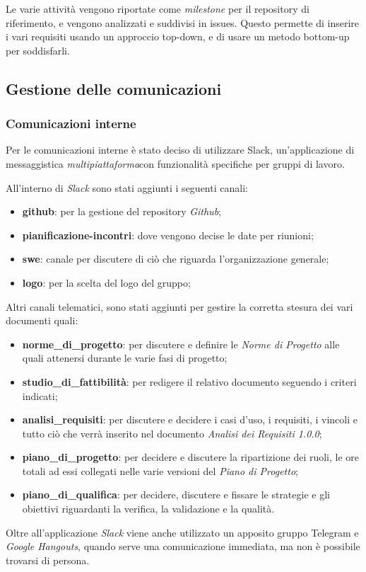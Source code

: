    		\noindent Le varie attività vengono riportate come \textit{milestone\glo} per il repository di riferimento, e vengono analizzati e suddivisi in issues. Questo permette di inserire i vari requisiti usando un approccio top-down, e di usare un metodo bottom-up per soddisfarli.
   		
   	\subsection{Gestione delle comunicazioni}
   		\subsubsection{Comunicazioni interne}
   		Per le comunicazioni interne è stato deciso di utilizzare  Slack\glos, un'applicazione di messaggistica \textit{multipiattaforma}\glo con funzionalità specifiche per gruppi di lavoro. 
   		
   		\noindent All'interno di \textit{Slack\glo} sono stati aggiunti i seguenti canali:
   		\begin{itemize}
   			\item \textbf{github}: per la gestione del repository \textit{Github\glo};
   			\item \textbf{pianificazione-incontri}: dove vengono decise le date per riunioni;
   			\item \textbf{swe}: canale per discutere di ciò che riguarda l'organizzazione generale;
   			\item \textbf{logo}: per la scelta del logo del gruppo;
   			
   		\end{itemize}
   		Altri canali telematici, sono stati aggiunti per gestire la corretta stesura dei vari documenti quali:
   		\begin{itemize}
   			\item \textbf{norme\_di\_progetto}: per discutere e definire le \textit{Norme di Progetto\doc} alle quali attenersi durante le varie fasi di progetto;
   			\item \textbf{studio\_di\_fattibilità}: per redigere il relativo documento seguendo i criteri indicati;
   			\item \textbf{analisi\_requisiti}: per discutere e decidere i casi d'uso, i requisiti, i vincoli e tutto ciò che verrà inserito nel documento \textit{Analisi dei Requisiti 1.0.0\docs};
   			\item \textbf{piano\_di\_progetto}: per decidere e discutere la ripartizione dei ruoli, le ore totali ad essi collegati nelle varie versioni del \textit{Piano di Progetto\docs};
   			\item \textbf{piano\_di\_qualifica}: per decidere, discutere e fissare le strategie e gli obiettivi riguardanti la verifica, la validazione e la qualità.
   		\end{itemize}
   		Oltre all'applicazione \textit{Slack\glo} viene anche utilizzato un apposito gruppo Telegram e \textit{Google Hangouts\glo}, quando serve una comunicazione immediata, ma non è possibile trovarsi di persona.
   		
